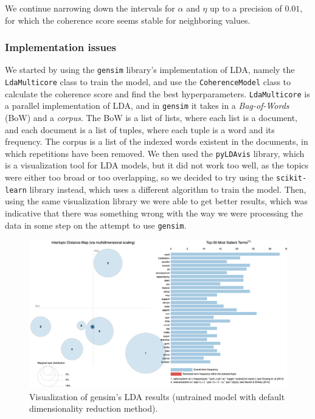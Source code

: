 \documentclass[conference, onecolumn]{IEEEtran}
\begin{document}
We continue narrowing down the intervals for $\alpha$ and $\eta$ up to a
precision of $0.01$, for which the coherence score seems stable for neighboring
values.

\subsubsection{Implementation issues} \label{sec:methodology:statistics-issues}

We started by using the \verb|gensim| library's implementation of LDA, namely
the \verb|LdaMulticore| class to train the model, and use the
\verb|CoherenceModel| class to calculate the coherence score and find the best
hyperparameters.
\verb|LdaMulticore| is a parallel implementation of LDA, and in \verb|gensim|
it takes in a \textit{Bag-of-Words} (BoW) and a \textit{corpus}.
The BoW is a list of lists, where each list is a document, and each document is
a list of tuples, where each tuple is a word and its frequency.
The corpus is a list of the indexed words existent in the documents, in which
repetitions have been removed.
We then used the \verb|pyLDAvis| library, which is a visualization tool for LDA
models, but it did not work too well, as the topics were either too broad or
too overlapping, so we decided to try using the \verb|scikit-learn| library
instead, which uses a different algorithm to train the model.
Then, using the same visualization library we were able to get better results,
which was indicative that there was something wrong with the way we were
processing the data in some step on the attempt to use \verb|gensim|.

\begin{figure}[H]
    \centering
    \includegraphics[width=\linewidth]{gensim-untrained.png}
    \caption{Visualization of gensim's LDA results (untrained model with
        default dimensionality reduction method).}
    \label{fig:lda_gensim_untrained}
\end{figure}
\end{document}
